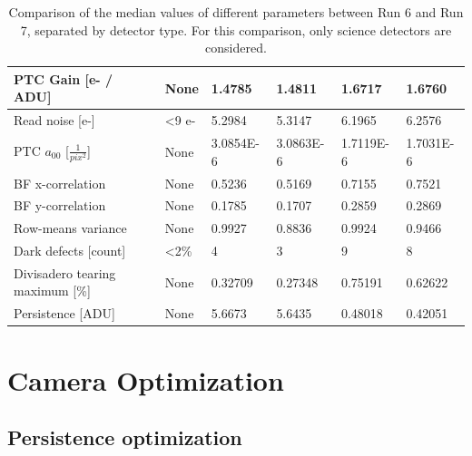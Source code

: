 \begin{table}[ht]
{\begin{tabular}{|l|l|ll|ll|}
PTC Gain {[}e- / ADU{]}            & None               & \multicolumn{1}{l|}{1.4785}    & 1.4811    & \multicolumn{1}{l|}{1.6717}    & 1.6760     \\ \hline
Read noise {[}e-{]}            & <9 e-               & \multicolumn{1}{l|}{5.2984}    &   5.3147  & \multicolumn{1}{l|}{6.1965}    &  6.2576    \\ \hline
PTC $a_{00}$ [$\frac{1}{pix^2}$]   & None               & \multicolumn{1}{l|}{3.0854E-6} & 3.0863E-6 & \multicolumn{1}{l|}{1.7119E-6} & 1.7031E-6  \\ \hline
BF x-correlation                   & None               & \multicolumn{1}{l|}{0.5236}    & 0.5169    & \multicolumn{1}{l|}{0.7155}    & 0.7521     \\ \hline
BF y-correlation                   & None               & \multicolumn{1}{l|}{0.1785}    & 0.1707    & \multicolumn{1}{l|}{0.2859}    & 0.2869     \\ \hline
Row-means variance                 & None               & \multicolumn{1}{l|}{0.9927}    & 0.8836    & \multicolumn{1}{l|}{0.9924}    & 0.9466     \\ \hline
Dark defects {[}count{]}           & <2\%               & \multicolumn{1}{l|}{4} & 3 & \multicolumn{1}{l|}{9} & 8  \\ \hline
Divisadero tearing maximum {[}\%{]}& None               & \multicolumn{1}{l|}{0.32709}   & 0.27348   & \multicolumn{1}{l|}{0.75191}   & 0.62622    \\ \hline
Persistence {[}ADU{]}              & None               & \multicolumn{1}{l|}{5.6673}    & 5.6435    & \multicolumn{1}{l|}{0.48018}   & 0.42051    \\ \hline
\end{tabular}
}
\label{tab:initRever:Table}
\caption{Comparison of the median values of different parameters between Run 6 and Run 7, separated by detector type. For this comparison, only science detectors are considered.}
\end{table}

\clearpage

\section{Camera Optimization}\label{sec:camera-optimization}

\subsection{Persistence optimization}\label{sec:persistence-optimization}


